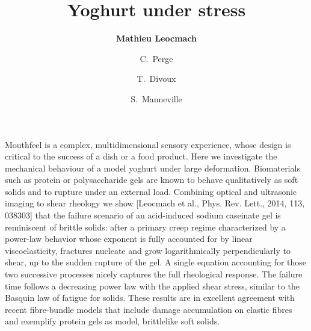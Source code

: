 \documentclass[onecolumn,12pt,tightenlines, a4paper,superscriptaddress,notitlepage]{revtex4-1}
\begin{document}
\title{Yoghurt under stress}

\author{\bf Mathieu Leocmach}
\author{C.~Perge}
\author{T.~Divoux}
\author{S.~Manneville}

\maketitle

Mouthfeel is a complex, multidimensional  sensory experience, whose design is critical to the success of a dish or a food product. Here we investigate the mechanical behaviour of a model yoghurt under large deformation. Biomaterials such as protein or polysaccharide gels are known to behave qualitatively as soft solids and to rupture under an external load. Combining optical and ultrasonic imaging to shear rheology we show [Leocmach et al., Phys. Rev. Lett., 2014, 113, 038303] that the failure scenario of an acid-induced sodium caseinate gel is reminiscent of brittle solids: after a primary creep regime characterized by a power-law behavior whose exponent is fully accounted for by linear viscoelasticity, fractures nucleate and grow logarithmically perpendicularly to shear, up to the sudden rupture of the gel. A single equation accounting for those two successive processes nicely captures the full rheological response. The failure time follows a decreasing power law with the applied shear stress, similar to the Basquin law of fatigue for solids. These results are in excellent agreement with recent fibre-bundle models that include damage accumulation on elastic fibres and exemplify protein gels as model, brittlelike soft solids.
\end{document}
